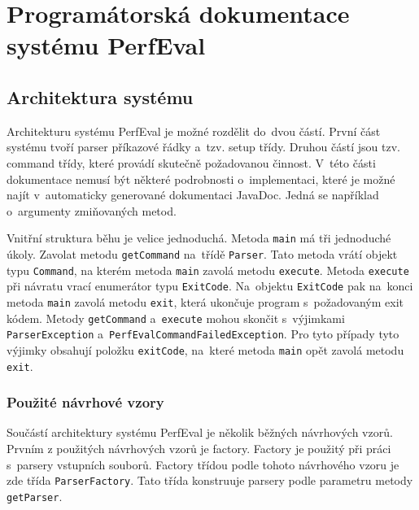 \chapter{Programátorská dokumentace systému PerfEval}

\section{Architektura systému}

Architekturu systému PerfEval je možné rozdělit do~dvou částí. První část systému tvoří
parser příkazové řádky a~tzv. setup třídy. Druhou částí jsou tzv. command třídy,
které provádí skutečně požadovanou činnost. V~této části dokumentace nemusí být
některé podrobnosti o~implementaci, které je možné najít v~automaticky generované dokumentaci
JavaDoc. Jedná se například o~argumenty zmiňovaných metod.

Vnitřní struktura běhu je velice jednoduchá. Metoda \lstinline{main} má tři jednoduché úkoly.
Zavolat metodu \lstinline{getCommand} na~třídě \lstinline{Parser}. Tato metoda vrátí objekt typu \lstinline{Command},
na kterém metoda \lstinline{main} zavolá metodu \lstinline{execute}. Metoda \lstinline{execute} při návratu vrací enumerátor
typu \lstinline{ExitCode}. Na~objektu \lstinline{ExitCode} pak na~konci metoda \lstinline{main} zavolá metodu \lstinline[keywords={}]{exit},
která ukončuje program s~požadovaným exit kódem. Metody \lstinline{getCommand} a~\lstinline{execute} mohou skončit
s~výjimkami \lstinline{ParserException} a~\lstinline{PerfEvalCommandFailedException}. Pro tyto případy tyto
výjimky obsahují položku \lstinline{exitCode}, na~které metoda \lstinline{main} opět zavolá metodu \lstinline[keywords={}]{exit}.

\subsection{Použité návrhové vzory}

Součástí architektury systému PerfEval je několik běžných návrhových vzorů.
Prvním z použitých návrhových vzorů je factory. Factory je použitý
při práci s~parsery vstupních souborů. Factory třídou podle tohoto návrhového vzoru je
zde třída \lstinline{ParserFactory}. Tato třída konstruuje parsery podle parametru metody
\lstinline{getParser}.

